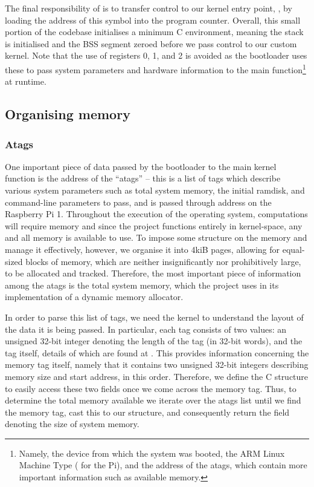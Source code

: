         The final responsibility of  is to transfer control to our
        kernel entry point, , by loading the address of this
        symbol into the program counter. Overall, this small portion of the
        codebase initialises a minimum C environment, meaning the stack is
        initialised and the BSS segment zeroed before we pass control to our
        custom kernel. Note that the use of registers 0, 1, and 2 is avoided as
        the bootloader uses these to pass system parameters and hardware
        information to the main function\footnote{Namely, the device from which
        the system was booted, the ARM Linux Machine Type ( for the
        Pi), and the address of the atags, which contain more important
        information such as available memory.} at runtime.

\subsection{Organising memory}
    \subsubsection{Atags}
        One important piece of data passed by the bootloader to the main kernel
        function is the address of the ``atags'' -- this is a list of tags which
        describe various system parameters such as total system memory, the
        initial ramdisk, and command-line parameters to pass, and is passed
        through address  on the Raspberry Pi 1. Throughout the
        execution of the operating system, computations will require memory and
        since the project functions entirely in kernel-space, any and all memory
        is available to use. To impose some structure on the memory and manage
        it effectively, however, we organise it into 4kiB pages, allowing for
        equal-sized blocks of memory, which are neither insignificantly nor
        prohibitively large, to be allocated and tracked. Therefore, the most
        important piece of information among the atags is the total system
        memory, which the project uses in its implementation of a dynamic memory
        allocator.

        In order to parse this list of tags, we need the kernel to understand
        the layout of the data it is being passed. In particular, each tag
        consists of two values: an unsigned 32-bit integer denoting the length
        of the tag (in 32-bit words), and the tag itself, details of which are
        found at \cite{atags}. This provides information concerning the memory
        tag itself, namely that it contains two unsigned 32-bit integers
        describing memory size and start address, in this order. Therefore, we
        define the C structure  to easily access these two
        fields once we come across the memory tag. Thus, to determine the total
        memory available we iterate over the atags list until we find the memory
        tag, cast this to our  structure, and consequently
        return the field denoting the size of system memory.

